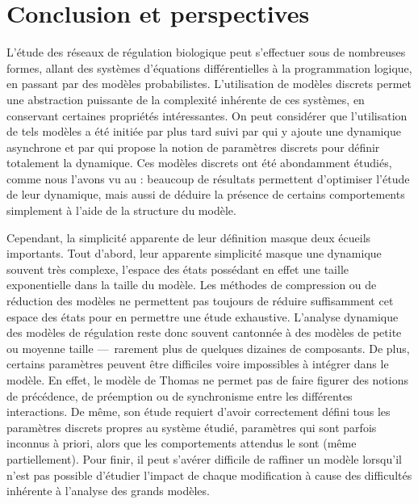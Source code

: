 
\chapter{Conclusion et perspectives}




L'étude des réseaux de régulation biologique peut s'effectuer sous de nombreuses formes,
allant des systèmes d'équations différentielles à la programmation logique,
en passant par des modèles probabilistes.
L'utilisation de modèles discrets permet une abstraction puissante de la complexité inhérente
de ces systèmes, en conservant certaines propriétés intéressantes.
On peut considérer que l'utilisation de tels modèles a été initiée par
 plus tard suivi par 
qui y ajoute une dynamique asynchrone
et par 
qui propose la notion de paramètres discrets pour définir totalement la dynamique.
Ces modèles discrets ont été abondamment étudiés,
comme nous l'avons vu au  :
beaucoup de résultats permettent d'optimiser l'étude de leur dynamique,
mais aussi de déduire la présence de certains comportements
simplement à l'aide de la structure du modèle.

Cependant, la simplicité apparente de leur définition masque deux écueils importants.
Tout d'abord, leur apparente simplicité masque une dynamique souvent très complexe,
l'espace des états possédant en effet une taille exponentielle dans la taille du modèle.
Les méthodes de compression ou de réduction des modèles ne permettent pas toujours
de réduire suffisamment cet espace des états pour en permettre une étude exhaustive.
L'analyse dynamique des modèles de régulation reste donc souvent cantonnée
à des modèles de petite ou moyenne taille ---~rarement plus de quelques dizaines de composants.
De plus, certains paramètres peuvent être difficiles voire impossibles à intégrer dans le modèle.
En effet, le modèle de Thomas ne permet pas de faire figurer des notions de précédence,
de préemption ou de synchronisme entre les différentes interactions.
De même, son étude requiert d'avoir correctement défini tous les paramètres discrets
propres au système étudié, paramètres qui sont parfois inconnus à priori,
alors que les comportements attendus le sont (même partiellement).
Pour finir, il peut s'avérer difficile de raffiner un modèle lorsqu'il n'est pas
possible d'étudier l'impact de chaque modification
à cause des difficultés inhérente à l'analyse des grands modèles.

